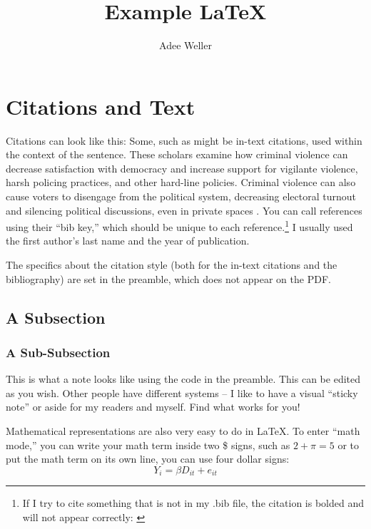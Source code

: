 \documentclass[12pt, letterpaper]{article}
\title{Example \LaTeX}
\author{Adee Weller}
\date{}
\newenvironment{note}{ 
\def\FrameCommand{\hspace{-2em}
\begin{sideways}
\textcolor{orange}{\textsf{\small NOTE}}
\end{sideways}
\hspace{0.5em}\textcolor{orange}{\vrule width 0.5pt} \hspace{0.5em}}\MakeFramed {\advance\hsize-\width \FrameRestore}}
{\endMakeFramed}
\begin{document}
\maketitle



\section{Citations and Text}

Citations can look like this: Some, such as \textcite{bateson2012,curtice2020,Hiskey2020} might be in-text citations, used within the context of the sentence. These scholars examine how criminal violence can decrease satisfaction with democracy and increase support for vigilante violence, harsh policing practices, and other hard-line policies. Criminal violence can also cause voters to disengage from the political system, decreasing electoral turnout and silencing political discussions, even in private spaces \citep{trejo2020}. You can call references using their ``bib key,'' which should be unique to each reference.\footnote{If I try to cite something that is not in my .bib file, the citation is bolded and will not appear correctly: \textcite{acemoglu2023}} I usually used the first author's last name and the year of publication. 

The specifics about the citation style (both for the in-text citations and the bibliography) are set in the preamble, which does not appear on the PDF. 




\subsection{A Subsection}

\subsubsection{A Sub-Subsection}

\begin{note}
   This is what a note looks like using the code in the preamble. This can be edited as you wish. Other people have different systems -- I like to have a visual ``sticky note'' or aside for my readers and myself. Find what works for you!
\end{note}


Mathematical representations are also very easy to do in \LaTeX. To enter ``math mode,'' you can write your math term inside two \$ signs, such as $2+\pi=5$ or to put the math term on its own line, you can use four dollar signs:
$$Y_i = \beta D_{it} + e_{it}$$
\end{document}
